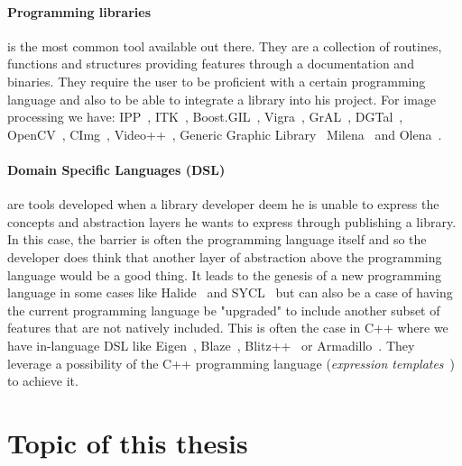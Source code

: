 \paragraph{Programming libraries} is the most common tool available out there. They are a collection of routines,
functions and structures providing features through a documentation and binaries. They require the user to be proficient
with a certain programming language and also to be able to integrate a library into his project. For image processing we
have: IPP~\parencite{taylor.2004.intel}, ITK~\parencite{johnson.2013.ITKSoftwareGuideThirdEdition},
Boost.GIL~\parencite{bourdev.2006.bgil}, Vigra~\parencite{kothe.2011.generic}, GrAL~\parencite{berti.2006.gral},
DGTal~\parencite{coeurjolly.2016.dgtal}, OpenCV~\parencite{bradski.2000.opencv}, CImg~\parencite{tschumperle.2012.cimg},
Video++~\parencite{garrigues.2014.video++}, Generic Graphic Library~\parencite{kolas.2000.gegl}
Milena~\parencite{levillain.2009.ismm,levillain.2010.icip} and
Olena~\parencite{olena.2000.www,levillain.2011.phd,geraud.2012.hdr,levillain.2014.ciarp}.

\paragraph{Domain Specific Languages (DSL)} are tools developed when a library developer deem he is unable to express
the concepts and abstraction layers he wants to express through publishing a library. In this case, the barrier is often
the programming language itself and so the developer does think that another layer of abstraction above the programming
language would be a good thing. It leads to the genesis of a new programming language in some cases like
Halide~\parencite{ragankelley.2013.halide} and SYCL~\parencite{brown.2019.heterogeneous,wong.2019.heterogeneous} but can
also be a case of having the current programming language be "upgraded" to include another subset of features that are
not natively included. This is often the case in C++ where we have in-language DSL like
Eigen~\cite{guennebaud.2010.eigen}, Blaze~\cite{iglberger.2012.blaze,iglberger.2012_1.blaze},
Blitz++~\cite{veldhuizen.2000.blitz} or Armadillo~\cite{sanderson.2016.armadillo}. They leverage a possibility of the
C++ programming language (\emph{expression templates}~\cite{veldhuizen.1995.expression}) to achieve it.


\section*{Topic of this thesis}

